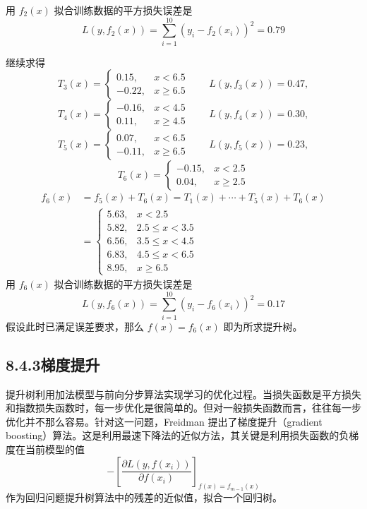 \documentclass[UTF8,12pt,a4paper,fontset=fandol]{ctexart}
\begin{document}
用 $f_2(x)$ 拟合训练数据的平方损失误差是
\[
L(y,f_2(x))=\sum_{i=1}^{10}(y_i-f_2(x_i))^2=0.79
\]

继续求得
\[
T_3(x)=
\begin{cases}
0.15, & x<6.5\\
-0.22, & x\geq 6.5
\end{cases}
\qquad
L(y,f_3(x))=0.47,
\]
\[
T_4(x)=
\begin{cases}
-0.16, & x<4.5\\
0.11, & x\geq 4.5
\end{cases}
\qquad
L(y,f_4(x))=0.30,
\]
\[
T_5(x)=
\begin{cases}
0.07, & x<6.5\\
-0.11, & x\geq 6.5
\end{cases}
\qquad
L(y,f_5(x))=0.23,
\]
\[
T_6(x)=
\begin{cases}
-0.15, & x<2.5\\
0.04, & x\geq 2.5
\end{cases}
\]
\[
\begin{aligned}
f_6(x)&=f_5(x)+T_6(x)=T_1(x)+\cdots+T_5(x)+T_6(x)\\
&=
\begin{cases}
5.63, & x<2.5\\
5.82, & 2.5\leq x<3.5\\
6.56, & 3.5\leq x<4.5\\
6.83, & 4.5\leq x<6.5\\
8.95, & x\geq 6.5
\end{cases}
\end{aligned}
\]
用 $f_6(x)$ 拟合训练数据的平方损失误差是
\[
L(y,f_6(x))=\sum_{i=1}^{10}(y_i-f_6(x_i))^2=0.17
\]
假设此时已满足误差要求，那么 $f(x)=f_6(x)$ 即为所求提升树。

\subsection*{8.4.3\quad 梯度提升}

提升树利用加法模型与前向分步算法实现学习的优化过程。当损失函数是平方损失和指数损失函数时，每一步优化是很简单的。但对一般损失函数而言，往往每一步优化并不那么容易。针对这一问题，Freidman 提出了梯度提升（gradient boosting）算法。这是利用最速下降法的近似方法，其关键是利用损失函数的负梯度在当前模型的值
\[
-\left[\frac{\partial L(y,f(x_i))}{\partial f(x_i)}\right]_{f(x)=f_{m-1}(x)}
\]
作为回归问题提升树算法中的残差的近似值，拟合一个回归树。
\end{document}
